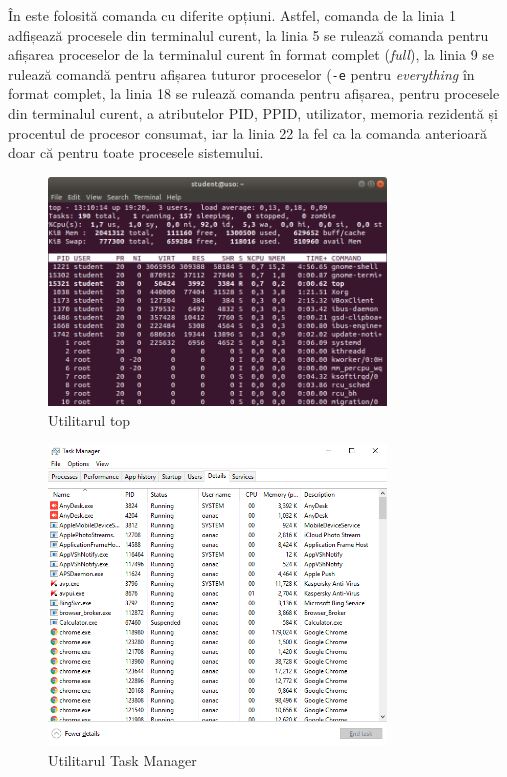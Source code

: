 În  este folosită comanda  cu diferite opțiuni. Astfel, comanda de la linia 1 adfișează procesele din terminalul curent, la linia 5 se rulează comanda pentru afișarea proceselor de la terminalul curent în format complet (\textit{full}), la linia 9 se rulează comandă pentru afișarea tuturor proceselor (\texttt{-e} pentru \textit{everything} în format complet, la linia 18 se rulează comanda pentru afișarea, pentru procesele din terminalul curent, a atributelor PID, PPID, utilizator, memoria rezidentă și procentul de procesor consumat, iar la linia 22 la fel ca la comanda anterioară doar că pentru toate procesele sistemului.

\begin{figure}[!htbp]
	\centering
	\includegraphics[width=0.8\textwidth]{chapters/04-process/img/top.png}
	\caption{Utilitarul top}
	\label{fig:process-top}
\end{figure}

\begin{figure}[!htbp]
	\centering
	\includegraphics[width=0.8\textwidth]{chapters/04-process/img/task-manager.png}
	\caption{Utilitarul Task Manager}
	\label{fig:process-task-manager}
\end{figure}

